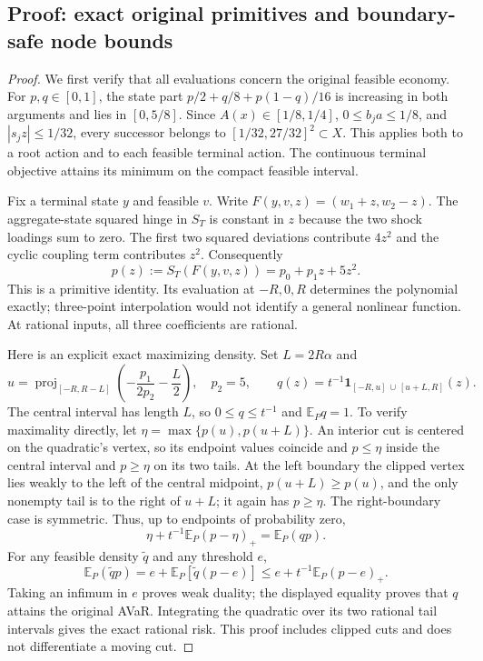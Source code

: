 \subsection{Proof: exact original primitives and boundary-safe node bounds}
\begin{proof}
We first verify that all evaluations concern the original feasible economy.
For $p,q\in[0,1]$, the state part
$p/2+q/8+p(1-q)/16$ is increasing in both arguments and lies in
$[0,5/8]$.  Since $A(x)\in[1/8,1/4]$, $0\le b_ja\le1/8$,
and $|s_jz|\le1/32$, every successor belongs to
$[1/32,27/32]^2\subset X$.  This applies both to a root action and to
each feasible terminal action.  The continuous terminal objective attains its
minimum on the compact feasible interval.

Fix a terminal state $y$ and feasible $v$.  Write
$F(y,v,z)=(w_1+z,w_2-z)$.  The aggregate-state squared hinge in
$S_T$ is constant in $z$ because the two shock loadings sum to zero.
The first two squared deviations contribute $4z^2$ and the cyclic
coupling term contributes $z^2$.  Consequently
\[
 p(z):=S_T(F(y,v,z))=p_0+p_1z+5z^2.
\]
This is a primitive identity.  Its evaluation at $-R,0,R$ determines
the polynomial exactly; three-point interpolation would not identify a
general nonlinear function.  At rational inputs, all three coefficients
are rational.

Here is an explicit exact maximizing density.  Set $L=2R\alpha$ and
\[
 u=\operatorname{proj}_{[-R,R-L]}
             \left(-\frac{p_1}{2p_2}-\frac L2\right),
 \quad p_2=5,\qquad
 q(z)=t^{-1}\boldsymbol1_{[-R,u]\,\cup\,[u+L,R]}(z).
\]
The central interval has length $L$, so $0\le q\le t^{-1}$ and
$\mathbb E_Pq=1$.  To verify maximality directly, let
$\eta=\max\{p(u),p(u+L)\}$.  An interior cut is centered on the
quadratic's vertex, so its endpoint values coincide and $p\le\eta$
inside the central interval and $p\ge\eta$ on its two tails.  At the
left boundary the clipped vertex lies weakly to the left of the central
midpoint, $p(u+L)\ge p(u)$, and the only nonempty tail is to the
right of $u+L$; it again has $p\ge\eta$.  The right-boundary case
is symmetric.  Thus, up to endpoints of probability zero,
\[
 \eta+t^{-1}\mathbb E_P(p-\eta)_+=\mathbb E_P(qp).
\]
For any feasible density $\widetilde q$ and any threshold $e$,
\[
 \mathbb E_P(\widetilde q p)
 =e+\mathbb E_P[\widetilde q(p-e)]
 \le e+t^{-1}\mathbb E_P(p-e)_+.
\]
Taking an infimum in $e$ proves weak duality; the displayed equality
proves that $q$ attains the original AVaR.  Integrating the quadratic
over its two rational tail intervals gives the exact rational risk.
This proof includes clipped cuts and does not differentiate a moving cut.


\end{proof}
